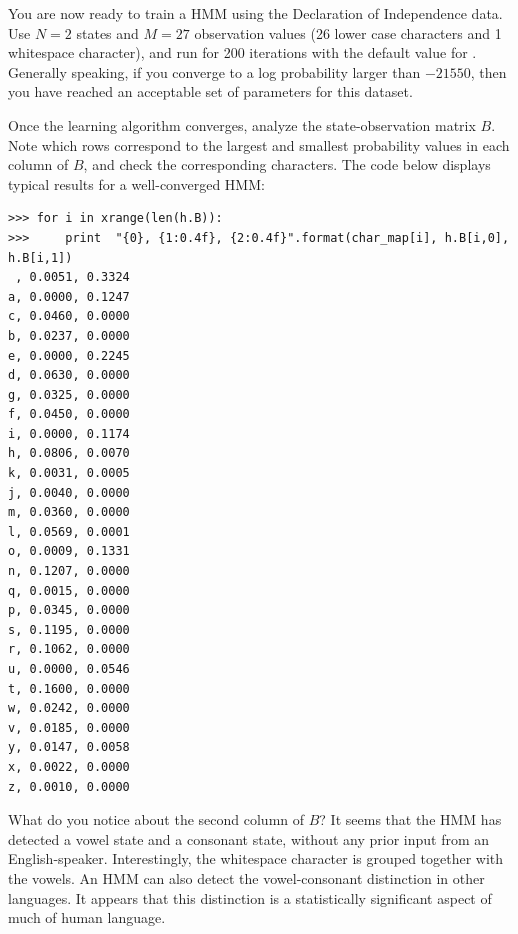 \begin{problem}
You are now ready to train a HMM using the Declaration of Independence data.
Use $N=2$ states and $M=27$ observation values (26 lower case characters and 1 whitespace character),
and run for 200 iterations with the default value for .
Generally speaking, if you converge to a log probability larger than $-21550$, then you have reached
an acceptable set of parameters for this dataset.

Once the learning algorithm converges, analyze the state-observation matrix $B$.
Note which rows correspond to the largest and smallest probability values in each column of $B$,
and check the corresponding characters.
The code below displays typical results for a well-converged HMM:
\begin{lstlisting}
>>> for i in xrange(len(h.B)):
>>>     print  "{0}, {1:0.4f}, {2:0.4f}".format(char_map[i], h.B[i,0], h.B[i,1])
 , 0.0051, 0.3324
a, 0.0000, 0.1247
c, 0.0460, 0.0000
b, 0.0237, 0.0000
e, 0.0000, 0.2245
d, 0.0630, 0.0000
g, 0.0325, 0.0000
f, 0.0450, 0.0000
i, 0.0000, 0.1174
h, 0.0806, 0.0070
k, 0.0031, 0.0005
j, 0.0040, 0.0000
m, 0.0360, 0.0000
l, 0.0569, 0.0001
o, 0.0009, 0.1331
n, 0.1207, 0.0000
q, 0.0015, 0.0000
p, 0.0345, 0.0000
s, 0.1195, 0.0000
r, 0.1062, 0.0000
u, 0.0000, 0.0546
t, 0.1600, 0.0000
w, 0.0242, 0.0000
v, 0.0185, 0.0000
y, 0.0147, 0.0058
x, 0.0022, 0.0000
z, 0.0010, 0.0000
\end{lstlisting}
What do you notice about the second column of $B$? It seems that the HMM has detected a vowel state and a consonant state, without any prior input from an English-speaker.
Interestingly, the whitespace character is grouped together with the vowels. An HMM can also detect the vowel-consonant distinction in other languages. It appears that
this distinction is a statistically significant aspect of much of human language.
\end{problem}




